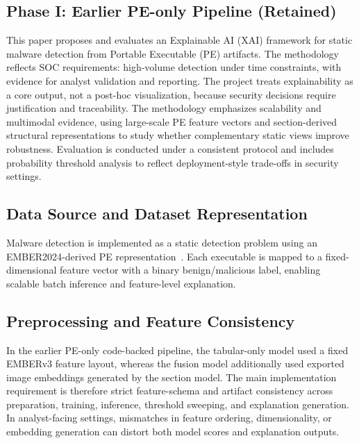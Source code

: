 \documentclass[conference]{IEEEtran}
\begin{document}
\subsection{Phase I: Earlier PE-only Pipeline (Retained)}

This paper proposes and evaluates an Explainable AI (XAI) framework for static malware detection from Portable Executable (PE) artifacts.
The methodology reflects SOC requirements: high-volume detection under time constraints, with evidence for analyst validation and reporting.
The project treats explainability as a core output, not a post-hoc visualization, because security decisions require justification and traceability.
The methodology emphasizes scalability and multimodal evidence, using large-scale PE feature vectors and section-derived structural representations to study whether complementary static views improve robustness.
Evaluation is conducted under a consistent protocol and includes probability threshold analysis to reflect deployment-style trade-offs in security settings.

\subsection{Data Source and Dataset Representation}

Malware detection is implemented as a static detection problem using an EMBER2024-derived PE representation~\cite{JMGPR2024,ember2024github}.
Each executable is mapped to a fixed-dimensional feature vector with a binary benign/malicious label, enabling scalable batch inference and feature-level explanation.

\subsection{Preprocessing and Feature Consistency}

In the earlier PE-only code-backed pipeline, the tabular-only model used a fixed EMBERv3 feature layout, whereas the fusion model additionally used exported image embeddings generated by the section model.
The main implementation requirement is therefore strict feature-schema and artifact consistency across preparation, training, inference, threshold sweeping, and explanation generation.
In analyst-facing settings, mismatches in feature ordering, dimensionality, or embedding generation can distort both model scores and explanation outputs.
\end{document}
